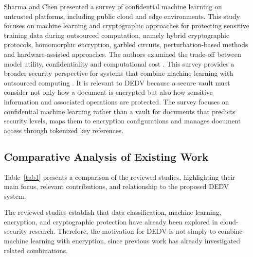 \documentclass[pdflatex,sn-mathphys-num]{sn-jnl}
\begin{document}
Sharma and Chen presented a survey of confidential machine learning on untrusted platforms,
including public cloud and edge environments. This study focuses on machine learning and
cryptographic approaches for protecting sensitive training data during outsourced computation,
namely hybrid cryptographic protocols, homomorphic encryption, garbled circuits,
perturbation-based methods and hardware-assisted approaches. The authors examined the trade-off
between model utility, confidentiality and computational cost
\cite{asikis2020optimization,sagar2021confidential}. This survey provides a broader security
perspective for systems that combine machine learning with outsourced computing
\cite{jauernig2020trusted}. It is relevant to DEDV because a secure vault must consider not only
how a document is encrypted but also how sensitive information and associated operations are
protected. The survey focuses on confidential machine learning rather than a vault for documents
that predicts security levels, maps them to encryption configurations and manages document access
through tokenized key references.

\subsection{Comparative Analysis of Existing Work}

Table~\ref{tab1} presents a comparison of the reviewed studies, highlighting their main focus,
relevant contributions, and relationship to the proposed DEDV system.

The reviewed studies establish that data classification, machine learning, encryption, and
cryptographic protection have already been explored in cloud-security research. Therefore, the
motivation for DEDV is not simply to combine machine learning with encryption, since previous
work has already investigated related combinations.
\end{document}
